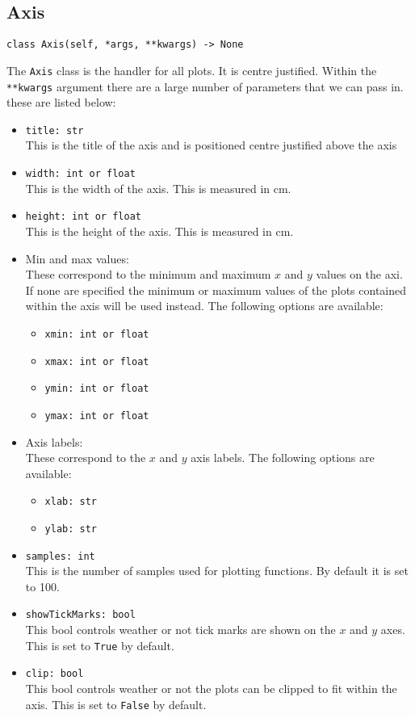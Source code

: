 \documentclass{article}
\begin{document}
\subsection[Axis]{Axis}
\lstset{language=python}
\begin{lstlisting}
class Axis(self, *args, **kwargs) -> None
\end{lstlisting}
The \verb|Axis| class is the handler for all plots. It is centre justified. Within the \verb|**kwargs| argument there are a large number of parameters that we can pass in. these are listed below:\begin{itemize}
\item \verb|title: str|\\This is the title of the axis and is positioned centre justified above the axis
\item \verb|width: int or float|\\This is the width of the axis. This is measured in cm.
\item \verb|height: int or float|\\This is the height of the axis. This is measured in cm.
\item Min and max values:\\
These correspond to the minimum and maximum $x$ and $y$ values on the axi. If none are specified the minimum or maximum values of the plots contained within the axis will be used instead. The following options are available:\begin{itemize}
\item \verb|xmin: int or float|
\item \verb|xmax: int or float|
\item \verb|ymin: int or float|
\item \verb|ymax: int or float|
\end{itemize}

\item Axis labels:\\
These correspond to the $x$ and $y$ axis labels. The following options are available:\begin{itemize}
\item \verb|xlab: str|
\item \verb|ylab: str|
\end{itemize}

\item \verb|samples: int|\\This is the number of samples used for plotting functions. By default it is set to 100.
\item \verb|showTickMarks: bool|\\This bool controls weather or not tick marks are shown on the $x$ and $y$ axes. This is set to \verb|True| by default.
\item \verb|clip: bool|\\This bool controls weather or not the plots can be clipped to fit within the axis. This is set to \verb|False| by default.
\end{itemize}
\end{document}

